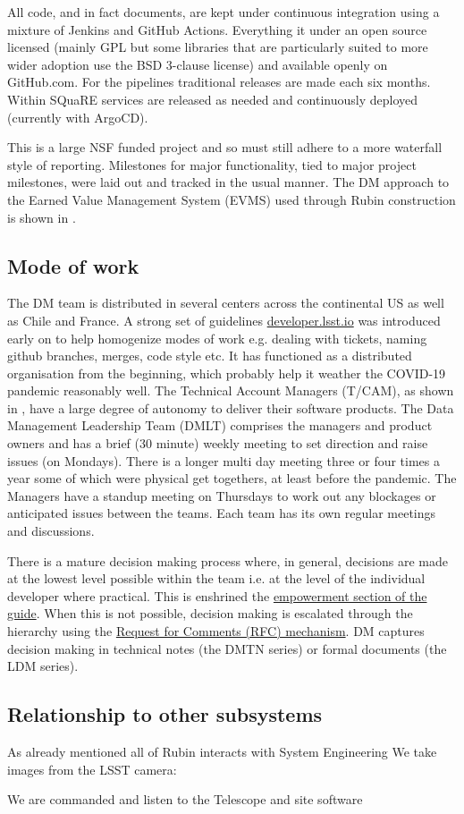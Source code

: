 All code, and in fact documents, are kept under continuous integration using a mixture of Jenkins and GitHub Actions.
Everything it under an open source licensed (mainly GPL but some libraries that are particularly suited to more wider adoption use the BSD 3-clause license) and available openly on GitHub.com.
For the pipelines traditional releases are made each six months.
Within SQuaRE services are released as needed and continuously deployed (currently with ArgoCD).

This is a large NSF funded project and so must still adhere to a more waterfall style of reporting.
Milestones for major functionality, tied to major project milestones, were laid out and tracked in the usual manner.
The DM approach to the Earned Value Management System (EVMS) used through Rubin construction is shown in \citet{DMTN-020,2016SPIE.9911E..0NK}.

\subsection{Mode of work}\label{sec:mode}
The DM  team is distributed in several centers across the continental US as well as Chile and France.
A strong set of guidelines \href{https:\\developer.lsst.io}{developer.lsst.io} was introduced early on to help homogenize modes of work e.g. dealing with tickets, naming github branches, merges, code style etc.
It has functioned as a distributed organisation from the beginning, which probably help it weather the COVID-19 pandemic reasonably well.
The Technical Account Managers (T/CAM), as shown in , have a large degree of autonomy to deliver their software products.
The Data Management Leadership Team (DMLT) comprises the managers and product owners and has a brief (30 minute) weekly meeting to set direction and raise issues (on Mondays).
There is a longer multi day meeting three or four times a year some of which were physical get togethers, at least before the pandemic.
The Managers have a standup meeting on Thursdays to work out any blockages or anticipated issues between the teams.
Each team has its own regular meetings and discussions.

There is a mature decision making process where, in general, decisions are made at the lowest level possible within the team i.e. at the level of the individual developer where practical. This is enshrined the \href{https://developer.lsst.io/team/empowerment.html}{empowerment section of the guide}.
When this is not possible, decision making is escalated through the hierarchy using  the \href{https://developer.lsst.io/communications/rfc.html}{Request for Comments (RFC) mechanism}.
DM captures decision making in technical notes (the DMTN series) or formal documents (the LDM series).


\subsection{Relationship to other subsystems}

As already mentioned all of Rubin interacts with System Engineering
   We take images from the  LSST camera: \citet{2010SPIE.7735E..0JK}

   We are commanded and listen to the  Telescope  and site software  \citep{2014SPIE.9145E..1AG}
